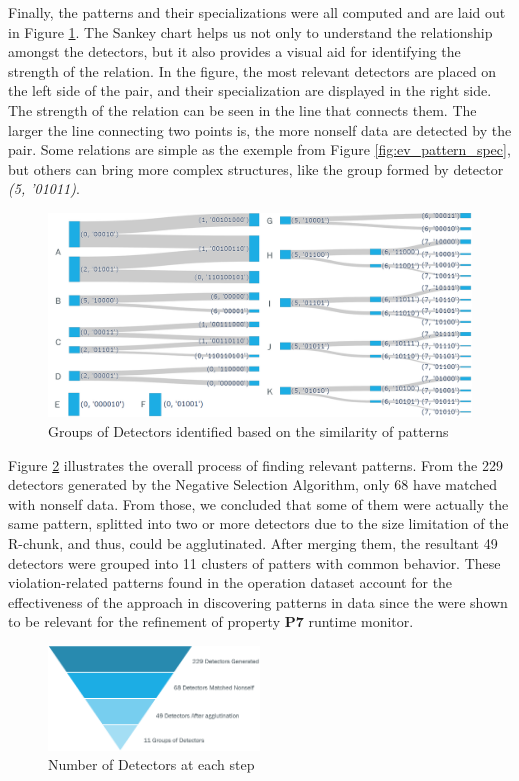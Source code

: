Finally, the patterns and their specializations were all computed and are laid out in Figure \ref{fig:ev_sankey}. The Sankey chart helps us not only to understand the relationship amongst the detectors, but it also provides a visual aid for identifying the strength of the relation. In the figure, the most relevant detectors are placed on the left side of the pair, and their specialization are displayed in the right side. The strength of the relation can be seen in the line that connects them. The larger the line connecting two points is, the more nonself data are detected by the pair. Some relations are simple as the exemple from Figure \ref{fig:ev_pattern_spec}, but others can bring more complex structures, like the group formed by detector \textit{(5, '01011)}.

\begin{figure}[]
	\centering
	\includegraphics[width=\textwidth, keepaspectratio]{img/sankey3.png}
	\caption{Groups of Detectors identified based on the similarity of patterns}
	\label{fig:ev_sankey}
\end{figure}

Figure \ref{fig:pyramid} illustrates the overall process of finding relevant patterns. From the 229 detectors generated by the Negative Selection Algorithm, only 68 have matched with nonself data. From those, we concluded that some of them were actually the same pattern, splitted into two or more detectors due to the size limitation of the R-chunk, and thus, could be agglutinated. After merging them, the resultant 49 detectors were grouped into 11 clusters of patters with common behavior. These violation-related patterns found in the operation dataset account for the effectiveness of the approach in discovering patterns in data since the were shown to be relevant for the refinement of property \textbf{P7} runtime monitor.

\begin{figure}[!h]
	\centering
	\includegraphics[width=0.5\textwidth, keepaspectratio]{img/detector_piramid.png}
	\caption{Number of Detectors at each step}
	\label{fig:pyramid}
\end{figure}

